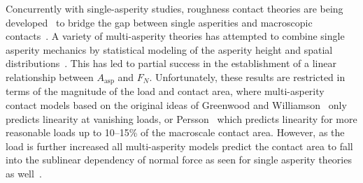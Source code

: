 
Concurrently with single-asperity studies, roughness contact theories are being developed~\cite{PhysRevLett.100.055504, Persson, GW, BUSH197587} to bridge the gap between single asperities and macroscopic contacts~\cite{mo_friction_2009}. A variety of multi-asperity theories has attempted to combine single asperity
mechanics by statistical modeling of the asperity height and spatial
distributions~\cite{CARBONE20082555}. This has led to partial success in the establishment of a linear relationship between $A_{\text{asp}}$ and $F_N$. Unfortunately, these results are restricted in terms of the magnitude of the load and contact area, where multi-asperity
contact models based on the original ideas of Greenwood and Williamson~\cite{GW}
only predicts linearity at vanishing loads, or Persson~\cite{Persson} which predicts linearity for more reasonable loads up to 10--15\% of the macroscale contact area. However, as the load is further increased all multi-asperity models
predict the contact area to fall into the sublinear dependency of normal force
as seen for single asperity theories as well~\cite{CARBONE20082555}.








